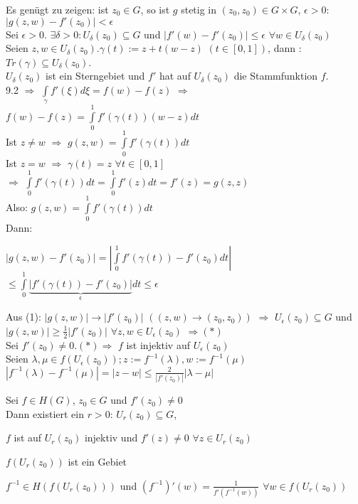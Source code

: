 \documentclass[a4paper,twoside,DIV15,BCOR12mm]{scrbook}
\begin{document}
\begin{beweis}
\begin{liste}
\item Es genügt zu zeigen: ist $z_0 \in G$, so ist $g$ stetig in $(z_0, z_0) \in G
\times G$, $\epsilon > 0$: $|g(z,w)-f'(z_0)| < \epsilon$ \\
Sei $\epsilon > 0$. $\exists \delta > 0: U_\delta(z_0) \subseteq G$ und
$|f'(w)-f'(z_0)| \leq \epsilon$ $\forall w \in U_\delta(z_0)$ \\
Seien $z,w \in U_\delta(z_0). \gamma(t):= z + t(w - z)$ $(t\in [0,1])$, dann : 
\\ $Tr(\gamma) \subseteq U_\delta(z_0)$. \\$U_\delta(z_0)$ ist ein Sterngebiet und
$f'$ hat auf $U_\delta(z_0)$ die Stammfunktion $f$. \\
9.2 $\Rightarrow $ $\int\limits_{\gamma} f'(\xi)d \xi = f(w) - f(z)$
$\Rightarrow$ $ f(w) - f(z) = \int\limits_{0}^1 f'(\gamma(t))(w-z)dt $ \\
Ist $z \neq w$ $\Rightarrow$ $g(z,w) =  \int\limits_{0}^1 f'(\gamma(t))dt $ \\
Ist $z = w$  $\Rightarrow$ $\gamma(t) = z$ $\forall t \in [0,1]$\\ $\Rightarrow$  
$\int\limits_{0}^1 f'(\gamma(t)) dt =  \int\limits_{0}^1 f'(z)dt = f'(z) =
g(z,z)$ \\ Also: $g(z,w) =  \int\limits_{0}^1 f'(\gamma(t))dt $ \\
Dann: \\
\centerline{$|g(z,w)-f'(z_0)| = | \int\limits_{0}^1 f'(\gamma(t))-f'(z_0)dt |$ $\leq 
\int\limits_{0}^1 \underbrace{|f'(\gamma(t))-f'(z_0)|}_{\epsilon}dt \leq \epsilon$}
\item Aus (1): $|g(z,w)| \to |f'(z_0)| $ $ ((z,w) \to (z_0, z_0))$ $\Rightarrow$
$U_\epsilon(z_0) \subseteq G$ und $|g(z,w)| \geq \frac{1}{2}|f'(z_0)|$ $\forall
z, w \in U_\epsilon(z_0)$ $\Rightarrow (*)$\\
Sei $f'(z_0) \neq 0. (*) \Rightarrow$ $f$ ist injektiv auf $U_\epsilon(z_0)$ \\
Seien $\lambda, \mu \in f(U_\epsilon(z_0)); z := f^{-1}(\lambda), w :=
f^{-1}(\mu)$ \\
$|f^{-1}(\lambda) - f^{-1}(\mu) | = |z -w | \leq \frac{2}{|f'(z_0)|}|\lambda - \mu|$
\end{liste}
\end{beweis}
\begin{satz}
Sei $f \in H(G)$, $z_0 \in G$ und $f'(z_0) \neq 0$ \\
Dann existiert ein $r > 0$: $U_r(z_0) \subseteq G$,
\begin{liste}
\item $f$ ist auf $U_r(z_0)$ injektiv und  $f'(z) \neq 0$ $\forall z \in U_r(z_0)$
\item $f(U_r(z_0))$ ist ein Gebiet
\item $f^{-1} \in H(f(U_r(z_0)))$ und $(f^{-1})'(w) = \frac{1}{f'(f^{-1}(w))}$
$\forall w \in f(U_r(z_0))$
\end{liste}
\end{satz}
\end{document}

